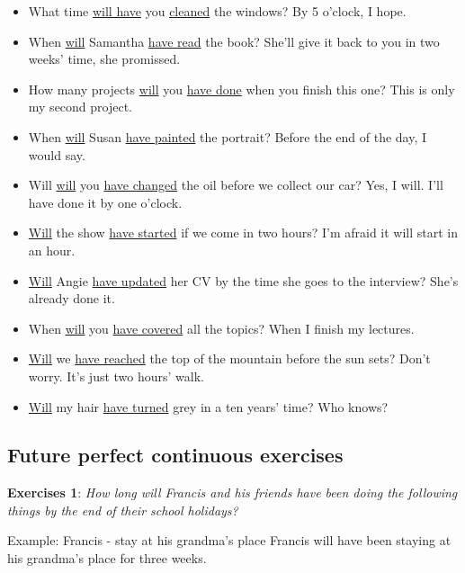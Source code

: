\begin{itemize}

\item What time \underline{will have} you \underline{cleaned} the windows? By 5 o'clock, I hope. 
\item When \underline{will} Samantha \underline{have read} the book? She'll give it back to you in two weeks' time, she promissed. 
\item How many projects \underline{will} you \underline{have done} when you finish this one? This is only my second project. 
\item When \underline{will} Susan \underline{have painted} the portrait? Before the end of the day, I would say. 
\item Will \underline{will} you \underline{have changed} the oil before we collect our car? Yes, I will. I'll have done it by one o'clock. 
\item \underline{Will} the show \underline{have started} if we come in two hours? I'm afraid it will start in an hour.
\item \underline{Will} Angie \underline{have updated} her CV by the time she goes to the interview? She's already done it.
\item When \underline{will} you \underline{have covered} all the topics? When I finish my lectures. 
\item \underline{Will} we \underline{have reached} the top of the mountain before the sun sets? Don't worry. It's just two hours' walk.
\item \underline{Will} my hair \underline{have turned} grey in a ten years' time? Who knows? 
\end{itemize}

\subsection{Future perfect continuous exercises}

\textbf{Exercises 1}: \textit{How long will Francis and his friends have been doing the following things by the end of their school holidays?}

Example: 
Francis - stay at his grandma's place 
Francis will have been staying at his grandma's place for three weeks. 

